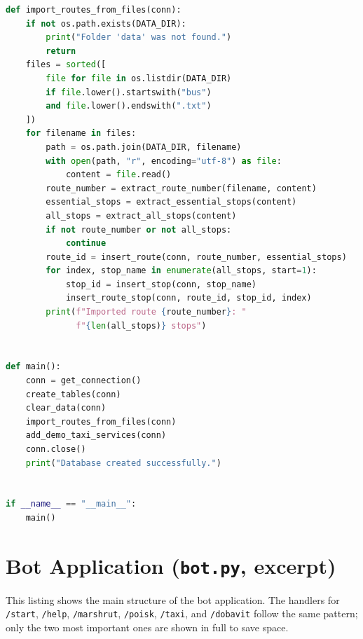 \begin{lstlisting}[language=Python, caption={Full source of
    \texttt{init\_db.py}}, label={lst:init-db}]
def import_routes_from_files(conn):
    if not os.path.exists(DATA_DIR):
        print("Folder 'data' was not found.")
        return
    files = sorted([
        file for file in os.listdir(DATA_DIR)
        if file.lower().startswith("bus")
        and file.lower().endswith(".txt")
    ])
    for filename in files:
        path = os.path.join(DATA_DIR, filename)
        with open(path, "r", encoding="utf-8") as file:
            content = file.read()
        route_number = extract_route_number(filename, content)
        essential_stops = extract_essential_stops(content)
        all_stops = extract_all_stops(content)
        if not route_number or not all_stops:
            continue
        route_id = insert_route(conn, route_number, essential_stops)
        for index, stop_name in enumerate(all_stops, start=1):
            stop_id = insert_stop(conn, stop_name)
            insert_route_stop(conn, route_id, stop_id, index)
        print(f"Imported route {route_number}: "
              f"{len(all_stops)} stops")


def main():
    conn = get_connection()
    create_tables(conn)
    clear_data(conn)
    import_routes_from_files(conn)
    add_demo_taxi_services(conn)
    conn.close()
    print("Database created successfully.")


if __name__ == "__main__":
    main()
\end{lstlisting}

\section{Bot Application (\texttt{bot.py}, excerpt)}
\label{app:bot-py}

This listing shows the main structure of the bot application. The handlers
for \texttt{/start}, \texttt{/help}, \texttt{/marshrut}, \texttt{/poisk},
\texttt{/taxi}, and \texttt{/dobavit} follow the same pattern; only the
two most important ones are shown in full to save space.

